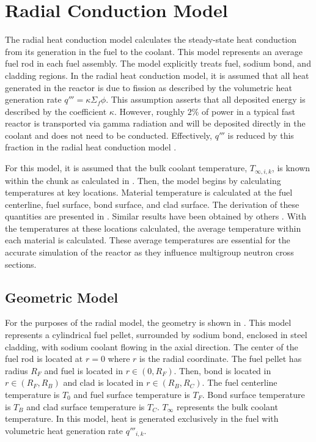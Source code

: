 \section{Radial Conduction Model}
  \label{sec:radial_conduction_model}
  The radial heat conduction model calculates the steady-state heat conduction
  from its generation in the fuel to the coolant. This model represents an
  average fuel rod in each fuel assembly. The model explicitly treats fuel,
  sodium bond, and cladding regions. In the radial heat conduction model, it is
  assumed that all heat generated in the reactor is due to fission as described
  by the volumetric heat generation rate ${q'''=\kappa \Sigma_f \phi}$. This
  assumption asserts that all deposited energy is described by the coefficient
  $\kappa$. However, roughly $2\%$ of power in a typical fast reactor is
  transported via gamma radiation and will be deposited directly in the coolant
  and does not need to be conducted. Effectively, $q'''$ is reduced by this
  fraction in the radial heat conduction model \cite{FastSpectrumReactors}.
  
  For this model, it is assumed that the bulk coolant temperature,
  $T_{\infty,i,k}$, is known within the chunk as calculated in
  . Then, the model begins by calculating
  temperatures at key locations. Material temperature is calculated at the fuel
  centerline, fuel surface, bond surface, and clad surface. The derivation of
  these quantities are presented in . Similar results
  have been obtained by others \cite{FastSpectrumReactors}. With the
  temperatures at these locations calculated, the average temperature within
  each material is calculated. These average temperatures are essential for the
  accurate simulation of the reactor as they influence multigroup neutron cross
  sections.

  \subsection{Geometric Model}
    For the purposes of the radial model, the geometry is shown in
    . This model represents a cylindrical fuel pellet,
    surrounded by sodium bond, enclosed in steel cladding, with sodium coolant
    flowing in the axial direction. The center of the fuel rod is located at
    $r=0$ where $r$ is the radial coordinate. The fuel pellet has radius $R_F$
    and fuel is located in $r \in (0,R_F)$. Then, bond is located in 
    $r \in (R_F,R_B)$ and clad is located in $r \in (R_B,R_C)$. The fuel 
    centerline temperature is $T_0$ and fuel surface temperature is $T_F$. Bond
    surface temperature is $T_B$ and clad surface temperature is 
    $T_C$. $T_{\infty}$ represents the bulk coolant temperature. In this model,
    heat is generated exclusively in the fuel with volumetric heat generation 
    rate $q'''_{i,k}$. 

